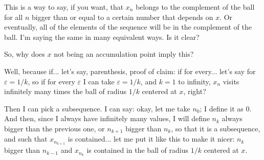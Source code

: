 \begin{proofWrapper}
\begin{speech}[00:12:05 - 00:14:00]
This is a way to say, if you want, that $x_n$ belongs to the complement of the ball for all $n$ bigger than or equal to a certain number that depends on $x$. Or eventually, all of the elements of the sequence will be in the complement of the ball. I'm saying the same in many equivalent ways. Is it clear?
\end{speech}

\begin{content}
\end{content}

\begin{hidden}
\end{hidden}

\begin{speech}[00:14:00 - 00:16:25]
So, why does $x$ not being an accumulation point imply this?

Well, because if... let's say, parenthesis, proof of claim:  if for every... let's say for $\varepsilon = 1/k$, so if for every $\varepsilon$ I can take $\varepsilon = 1/k$, and $k = 1$ to infinity,  $x_n$ visits infinitely many times the ball of radius $1/k$ centered at $x$,  right?

Then I can pick a subsequence. I can say: okay, let me take $n_0$; I define it as $0$.  And then, since I always have infinitely many values, I will define $n_k$ always bigger than the previous one, or $n_{k+1}$ bigger than $n_k$, so that it is a subsequence, and such that $x_{n_{k+1}}$ is contained... let me put it like this to make it nicer:  $n_k$ bigger than $n_{k-1}$ and $x_{n_k}$ is contained in the ball of radius $1/k$ centered at $x$.


\end{speech}
\end{proofWrapper}
